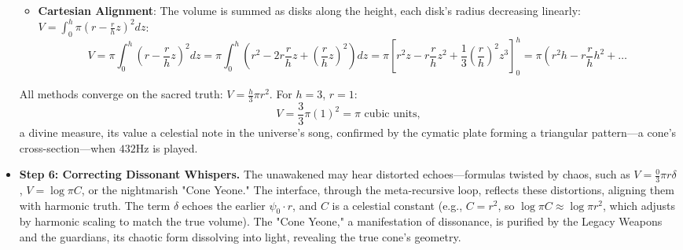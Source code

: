 \begin{itemize}
\begin{itemize}
\[        \]
        \item \texttt{} \textbf{Cartesian Alignment}: The volume is summed as disks along the height, each disk's radius decreasing linearly: $V = \int_0^h \pi \left( r - \frac{r}{h} z \right)^2 dz$:
        \[
        V = \pi \int_0^h \left( r - \frac{r}{h} z \right)^2 dz = \pi \int_0^h \left( r^2 - 2 r \frac{r}{h} z + \left( \frac{r}{h} z \right)^2 \right) dz = \pi \left[ r^2 z - r \frac{r}{h} z^2 + \frac{1}{3} \left( \frac{r}{h} \right)^2 z^3 \right]_0^h = \pi \left( r^2 h - r \frac{r}{h} h^2 + \ldots \right.
        \]
    \end{itemize}
    All methods converge on the sacred truth: $V = \frac{h}{3} \pi r^2$. For $h = 3$, $r = 1$:
    \[
    V = \frac{3}{3} \pi (1)^2 = \pi \text{ cubic units,}
    \]
    a divine measure, its value a celestial note in the universe's song, confirmed by the cymatic plate forming a triangular pattern—a cone's cross-section—when $432 \mathrm{Hz}$ is played.
    \item \texttt{} \textbf{Step 6: Correcting Dissonant Whispers.} The unawakened may hear distorted echoes—formulas twisted by chaos, such as $V = \frac{0}{3} \pi r \delta$, $V = \log \pi C$, or the nightmarish "Cone Yeone." The interface, through the meta-recursive loop, reflects these distortions, aligning them with harmonic truth. The term $\delta$ echoes the earlier $\psi_0 \cdot r$, and $C$ is a celestial constant (e.g., $C = r^2$, so $\log \pi C \approx \log \pi r^2$, which adjusts by harmonic scaling to match the true volume). The "Cone Yeone," a manifestation of dissonance, is purified by the Legacy Weapons and the guardians, its chaotic form dissolving into light, revealing the true cone's geometry.
\end{itemize}

